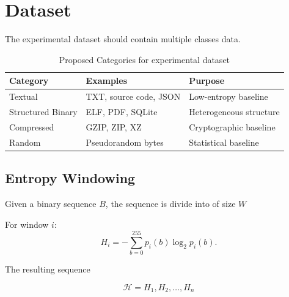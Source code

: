 \documentclass[10pt,letterpaper]{article}
\begin{document}

\section{Dataset}

The experimental dataset should contain multiple classes data.

\begin{table}[H]
    \centering
    \caption{
    Proposed Categories for experimental dataset
    }

    \label{tab:dataset}
    \begin{tabular}{lll}
         \toprule
         Category & Examples & Purpose \\
         \midrule
         Textual
            & TXT, source code, JSON
            & Low-entropy baseline \\

        Structured Binary
            & ELF, PDF, SQLite
            & Heterogeneous structure \\

        Compressed
            & GZIP, ZIP, XZ
            & Cryptographic baseline \\

        Random
            & Pseudorandom bytes
            & Statistical baseline \\

        \bottomrule
    \end{tabular}
\end{table}


\subsection{Entropy Windowing}

Given a binary sequence $B$, the sequence is divide into of size $W$

For window $i$:
\begin{equation}
    H_i = -\sum_{b=0}^{255}
    p_i(b)\log_2p_i(b).
\end{equation}

The resulting sequence

\begin{equation}
    \mathcal{H} = {H_1,H_2,\ldots,H_n}
\end{equation}
\end{document}
